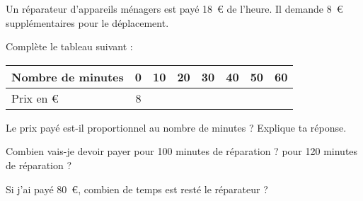 Un réparateur d'appareils ménagers est payé 18~\textgreek{\euro} de
l'heure. Il demande 8~\textgreek{\euro} supplémentaires pour le déplacement.
\begin{myenumerate}
\item Complète le tableau suivant :
\begin{center}
  \begin{tabularx}{15cm}{|X|c|c|c|c|c|c|c|}
\hline
Nombre de minutes&0&10&20&30&40&50&60\\
\hline
Prix en \textgreek{\euro}&8&&&&&&\\
\hline    
  \end{tabularx}
\end{center}
\item Le prix payé est-il proportionnel au nombre de minutes ?
  Explique ta réponse.
\item Combien vais-je devoir payer pour 100 minutes de réparation ?
  pour 120 minutes de réparation ?
\item Si j'ai payé 80~\textgreek{\euro}, combien de temps est resté le
  réparateur ?
\end{myenumerate}
